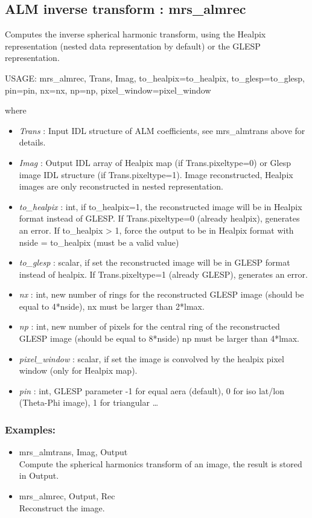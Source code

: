 \subsection{ALM inverse transform : mrs\_almrec}
Computes the inverse spherical harmonic transform, using the Healpix representation (nested data representation by default) or the GLESP representation.
{\bf
\begin{center}
     USAGE: mrs\_almrec, Trans, Imag, to\_healpix=to\_healpix, to\_glesp=to\_glesp, pin=pin, nx=nx, np=np, pixel\_window=pixel\_window
\end{center}}
where
\begin{itemize}
\item {\em Trans} : Input IDL structure of ALM coefficients, see mrs\_almtrans above for details.
\item {\em Imag} : Output IDL array of Healpix map (if Trans.pixeltype=0) or Glesp image IDL structure (if Trans.pixeltype=1). 
Image reconstructed, Healpix images are only reconstructed in nested representation.
\item {\em to\_healpix} : int, if to\_healpix=1, the reconstructed image will be in Healpix format instead of GLESP. 
If Trans.pixeltype=0 (already healpix), generates an error. If to\_healpix > 1, force the output to be in Healpix 
format with nside = to\_healpix (must be a valid value)
\item {\em to\_glesp} : scalar, if set the reconstructed image will be in GLESP format instead of healpix. If Trans.pixeltype=1 (already GLESP), generates an error.
\item {\em nx} : int, new number of rings for the reconstructed GLESP image (should be equal to 4*nside), nx must be larger than 2*lmax.
\item {\em np} : int, new number of pixels for the central ring of the reconstructed GLESP image (should be equal to 8*nside) np must be larger than 4*lmax.
\item {\em pixel\_window} : scalar, if set the image is convolved by the healpix pixel window (only for Healpix map).
\item {\em pin} : int, GLESP parameter -1 for equal aera (default), 0 for iso lat/lon (Theta-Phi image), 1 for triangular \dots
\end{itemize}

\subsubsection*{Examples:} 
\begin{itemize}
\item mrs\_almtrans, Imag, Output \\
Compute the spherical harmonics transform of an image, the result is stored in Output.
\item mrs\_almrec, Output, Rec \\
Reconstruct the image.
\end{itemize}



